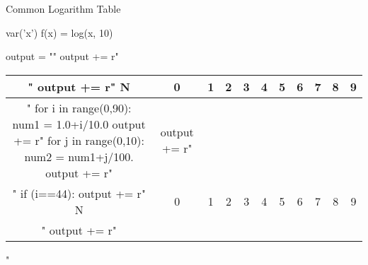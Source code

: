 \documentclass[12pt]{article}
\begin{document}
\pagestyle{empty}
\begin{center}
{\LARGE Common Logarithm Table}
\end{center}
\begin{sagesilent}
var('x')
f(x) = log(x, 10)

output = ""
output += r"\begin{supertabular}{ccccccccccc} "
output += r" N & 0 & 1 & 2 & 3 & 4 & 5 & 6 & 7 & 8 & 9 \\ \hline "
for i in range(0,90):
    num1 = 1.0+i/10.0
    output += r" %
    for j in range(0,10):
        num2 = num1+j/100.
        output += r"& %
    output += r"\\ "
    if (i==44):
        output += r" N & 0 & 1 & 2 & 3 & 4 & 5 & 6 & 7 & 8 & 9 \\ \hline "
output += r"\end{supertabular}"
\end{sagesilent}
\begin{center}
\end{center}
\end{document}
